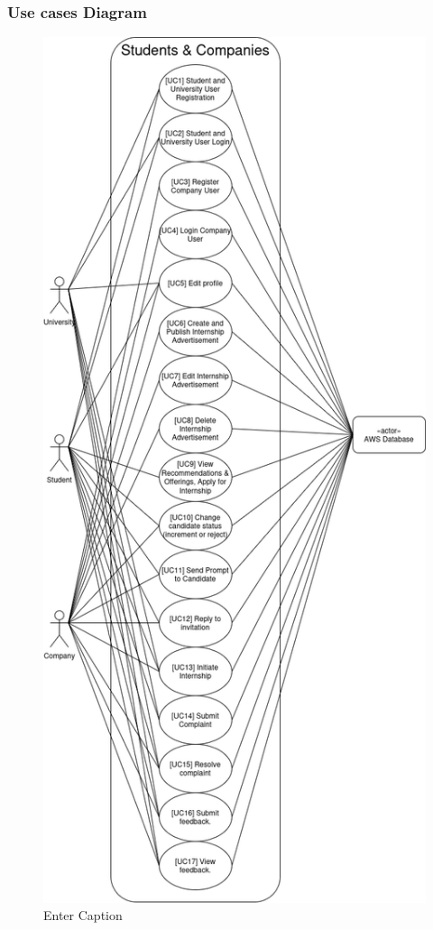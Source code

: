 \subsubsection{Use cases Diagram}
\begin{figure}[H]
    \centering
    \includegraphics[height=0.9\textheight]{Diagram 4.png}
    \caption{Enter Caption}
    \label{fig:enter-label}
\end{figure}

